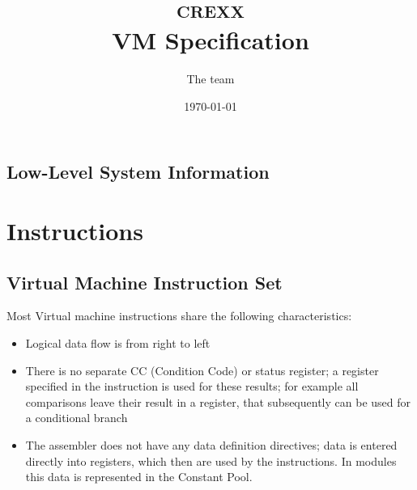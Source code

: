 

\renewcommand{\isbn}{978-90-819090-1-3}
\setcounter{tocdepth}{1}
\title{\textsc{crexx}\protect{}\\VM Specification}

\author{The \crexx{} team}
\date{\null\hfill \today}
\maketitle
{}
\pagestyle{plain}
\frontmatter
{}
\pagestyle{plain}

\tableofcontents

\newpage
{}
\frontmatter
\large






\mainmatter

\chapter{Low-Level System Information}


\part{Instructions}


\chapter{\crexx{} Virtual Machine Instruction Set}
Most \crexx{} Virtual machine instructions share the following
characteristics:
\begin{itemize}
\item Logical data flow is from right to left
  \item There is no separate CC (Condition Code) or status register; a
    register specified in the instruction is used for these results;
    for example all comparisons leave their result in a register, that
    subsequently can be used for a conditional branch
    \item The assembler does not have any data definition directives;
      data is entered directly into registers, which then are used by
      the instructions. In  modules this data is
      represented in the Constant Pool. 
\end{itemize}

